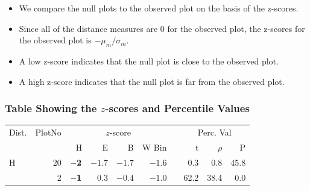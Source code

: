 \documentclass{beamer}
\begin{document}
\begin{frame}
\begin{itemize}
\item We compare the null plots to the observed plot on the basis of the z-scores.
\item Since all of the distance measures are 0 for the observed plot, the z-scores for the observed plot is $- \mu_m/ \sigma_m$.
\item A low z-score indicates that the null plot is close to the observed plot.
\item A high z-score indicates that the null plot is far from the observed plot.
\end{itemize}
\end{frame}

\begin{frame}
\frametitle{Table Showing the $z$-scores and Percentile Values}
\begin{table}[hbt]
	\vspace{-.4in}
%
\centering  %
\begin{tabular}{l r rrrr r rrr}  %
\hline                       %
Dist. & PlotNo &\multicolumn{4}{c}{$z$-score} & &\multicolumn{3}{c}{Perc. Val} \\ [0.5ex]   
 \cline{1-1}\cline{3-6}\cline{8-10}
 & & H & E & B & W Bin & & t & $\rho$ & P   \\     [0.5ex]
\hline
H  & 20 & $\bf -2$ & $-1.7$ & $-1.7$ & $-1.6$ & & 0.3 & 0.8 & 45.8 \\[-0.5ex]
 & 2 & $\bf -1$ & 0.3 & $-0.4$ & $-1.0$ & & 62.2 & 38.4 & 0.0\\[-0.5ex]


\end{tabular}
\end{table}
\end{frame}
\end{document}

